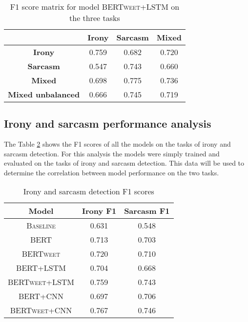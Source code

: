 \documentclass[10pt, a4paper]{article}
\begin{document}
\begin{table}[h!]
   \centering
   \begin{tabular}{|c|c|c|c|}
       \hline
       & \textbf{Irony} & \textbf{Sarcasm} & \textbf{Mixed} \\ \hline
       \textbf{Irony} & 0.759 & 0.682 & 0.720 \\ \hline
       \textbf{Sarcasm} & 0.547 & 0.743 & 0.660 \\ \hline
       \textbf{Mixed} & 0.698 & 0.775 & 0.736 \\ \hline
       \textbf{Mixed unbalanced} & 0.666 & 0.745 & 0.719\\ \hline
   \end{tabular}
   \caption{F1 score matrix for model \textsc{BERTweet+LSTM} on the three tasks}
   \label{tab:bertweet-bilstm-results}
\end{table}

\subsection{Irony and sarcasm performance analysis}\label{correlation}

The Table \ref{tab:correlation} shows the F1 scores of all the models on the tasks of irony and sarcasm detection.
For this analysis the models were simply trained and evaluated on the tasks of irony and sarcasm detection. 
This data will be used to determine the correlation between model performance on the two tasks.

\begin{table}[h!]
   \caption{Irony and sarcasm detection F1 scores}
   \label{tab:correlation}
   \begin{center}
   \begin{tabular}{|c|c|c|}
   \toprule
   Model & Irony F1 & Sarcasm F1 \\
   \midrule
   \textsc{Baseline} & 0.631 & 0.548 \\
   \textsc{BERT} & 0.713 & 0.703 \\
   \textsc{BERTweet} & 0.720 & 0.710 \\
   \textsc{BERT+LSTM} & 0.704 & 0.668 \\
   \textsc{BERTweet+LSTM} & 0.759 & 0.743 \\
   \textsc{BERT+CNN} & 0.697 & 0.706 \\
   \textsc{BERTweet+CNN} & 0.767 & 0.746 \\
   \bottomrule
   \end{tabular}
   \end{center}
\end{table}
\end{document}
